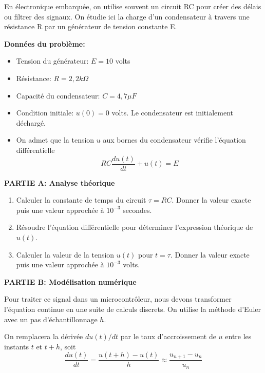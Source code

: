 \bigskip

\begin{exercice_cours}[\quad]{}

En électronique embarquée, on utilise souvent un circuit RC pour créer des délais ou filtrer des signaux. On étudie ici la charge d'un condensateur à travers une résistance R par un générateur de tension constante E.

\medskip

\textbf{Données du problème:}
\begin{itemize}
	\item Tension du générateur: $E=10$ volts
	\item Résistance: $R=2,2 k\Omega$
	\item Capacité du condensateur: $C=4,7 \mu F$
	\item Condition initiale: $u(0)=0$ volts. Le condensateur est initialement déchargé.	
	\item On admet que la tension $u$ aux bornes du condensateur vérifie l'équation différentielle  \[RC \dfrac{du(t)}{dt}+u(t)=E\]
\end{itemize}

\medskip

\textbf{PARTIE A: Analyse théorique}

\medskip

\begin{enumerate}[series=C]
	\item Calculer la constante de temps du circuit $\tau=RC$. Donner la valeur exacte puis une valeur approchée à $10^{-3}$ secondes.
	\item Résoudre l'équation différentielle pour déterminer l'expression théorique de $u(t)$.
	\item Calculer la valeur de la tension $u(t)$ pour $t=\tau$. Donner la valeur exacte puis une valeur approchée à $10^{-3}$ volts.
\end{enumerate}

\medskip

\textbf{PARTIE B: Modélisation numérique}

\medskip

Pour traiter ce signal dans un microcontrôleur, nous devons transformer l'équation continue en une suite de calculs discrets. On utilise la méthode d'Euler avec un pas d'échantillonnage $h$.

On remplacera la dérivée $du(t)/dt$ par le taux d'accroissement de $u$ entre les instants $t$ et $t+h$, soit \[\dfrac{du(t)}{dt}=\dfrac{u(t+h)-u(t)}{h} \approx \dfrac{u_{n+1}-u_n}{u_n}\]


\end{exercice_cours}
